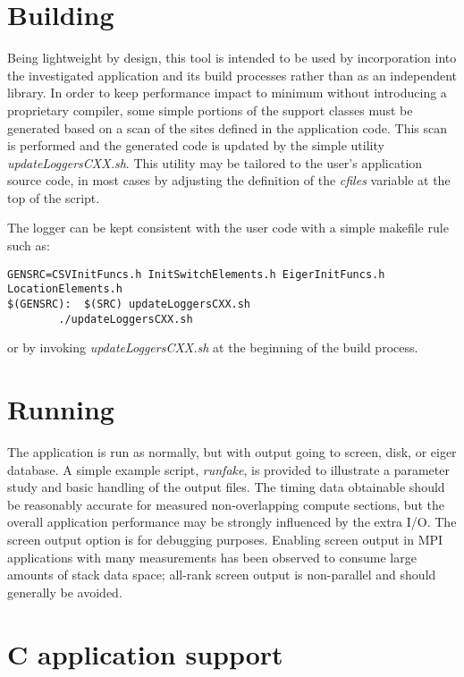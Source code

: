 \documentclass{article}
\begin{document}
\section{Building}
Being lightweight by design, this tool is intended to be used by incorporation into the investigated application and its build processes rather than as an independent library.  In order to keep performance impact to minimum without introducing a proprietary compiler, some simple portions of the support classes must be generated based on a scan of the sites defined in the application code. This scan is performed and the generated code is updated by the simple utility {\em updateLoggersCXX.sh}. This utility may be tailored to the user's application source code, in most cases by adjusting the definition of the {\em cfiles} variable at the top of the script.

The logger can be kept consistent with the user code with a simple makefile rule such as:
\begin{verbatim}
GENSRC=CSVInitFuncs.h InitSwitchElements.h EigerInitFuncs.h LocationElements.h
$(GENSRC):  $(SRC) updateLoggersCXX.sh
        ./updateLoggersCXX.sh
\end{verbatim}
or by invoking {\em updateLoggersCXX.sh} at the beginning of the build process.

\section{Running}
\label{sec:running}
The application is run as normally, but with output going to screen, disk, or eiger database. A simple example script, {\em runfake}, is provided to illustrate a parameter study and basic handling of the output files.
The timing data obtainable should be reasonably accurate for measured non-overlapping compute sections, but the overall application performance may be strongly influenced by the extra I/O.
The screen output option is for debugging purposes.
Enabling screen output in MPI applications with many measurements has been observed to consume large amounts of stack data space; all-rank screen output is non-parallel and should generally be avoided. 

\section{C application support}
\label{sec:langC}
\end{document}
